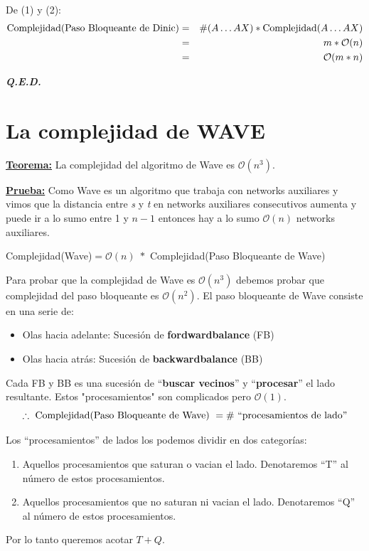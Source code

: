 \documentclass[12pt,a4paper]{report}
\newcommand{\QED}{\hfill \textit{\textbf{Q.E.D.}}}
\begin{document}
  			\par De (1) y (2):
  			\begin{eqnarray}
  				\nonumber \textup{Complejidad(Paso Bloqueante de Dinic)} &=& \# (A \dotsc A X) * \textup{Complejidad} (A \dotsc A X) \\
  				\nonumber &=& m * \mathcal{O}(n) \\
  				\nonumber &=& \mathcal{O}(m*n)
  			\end{eqnarray}

  		\QED


  	\section{La complejidad de WAVE}
  		\textbf{\underline{Teorema:}} La complejidad del algoritmo de Wave es $\mathcal{O}(n^{3})$.

  		\textbf{\underline{Prueba:}} Como Wave es un algoritmo que trabaja con networks auxiliares y vimos que la distancia entre \textit{s} y \textit{t} en networks auxiliares consecutivos aumenta y puede ir a lo sumo entre 1 y $n - 1$ entonces hay a lo sumo $\mathcal{O}(n)$ networks auxiliares.
  			\begin{center}
  				Complejidad(Wave)$ = \mathcal{O}(n) \; *$ Complejidad(Paso Bloqueante de Wave)
  			\end{center}

  			\par Para probar que la complejidad de Wave es $\mathcal{O}(n^{3})$ debemos probar que complejidad del paso bloqueante es $\mathcal{O}(n^{2})$. El paso bloqueante de Wave consiste en una serie de:
  			\begin{itemize}
  				\item Olas hacia adelante: Sucesión de \textbf{fordwardbalance} (FB)
  				\item Olas hacia atrás: Sucesión de \textbf{backwardbalance} (BB)
  			\end{itemize}

  			\par Cada FB y BB es una sucesión de \textquotedblleft \textbf{buscar vecinos}\textquotedblright \; y \textquotedblleft \textbf{procesar}\textquotedblright \; el lado resultante. Estos "procesamientos" \; son complicados pero $ \mathcal{O}(1)$.
  			\[ \therefore \textup{ Complejidad(Paso Bloqueante de Wave) } = \# \textup{ \textquotedblleft procesamientos de lado\textquotedblright} \]

  			\par Los \textquotedblleft procesamientos\textquotedblright \; de lados los podemos dividir en dos categorías:
  			\begin{enumerate}
  				\item Aquellos procesamientos que saturan o vacian el lado. Denotaremos \textquotedblleft T\textquotedblright \; al número de estos procesamientos.
  				\item Aquellos procesamientos que no saturan ni vacian el lado. Denotaremos \textquotedblleft Q\textquotedblright \; al número de estos procesamientos.
  			\end{enumerate}
  			\par Por lo tanto queremos acotar $T + Q$.
\end{document}
